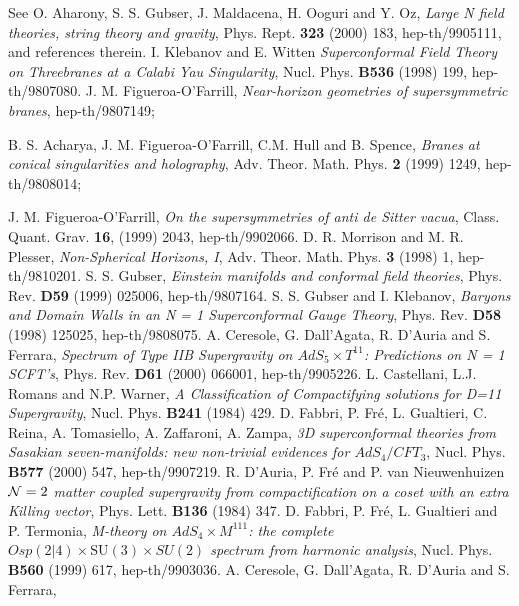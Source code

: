 \documentclass[a4paper,12pt]{article}
\begin{document}
\begin{thebibliography}{99}
 See O. Aharony, S. S. Gubser, J. Maldacena, H. Ooguri and Y. Oz,
{\it Large N field theories, string theory and gravity},
Phys. Rept. {\bf 323} (2000) 183,
hep-th/9905111, and references therein.
 I. Klebanov and E. Witten {\it Superconformal Field
Theory on Threebranes at a Calabi Yau Singularity},
Nucl. Phys. {\bf B536} (1998) 199, hep-th/9807080.
 J. M. Figueroa-O'Farrill, {\it Near-horizon geometries
of supersymmetric branes}, hep-th/9807149;
\par B. S. Acharya, J. M. Figueroa-O'Farrill, C.M. Hull and B. Spence,
{\it Branes at conical singularities and holography},
Adv. Theor. Math. Phys. {\bf 2} (1999) 1249, hep-th/9808014;
\par J. M. Figueroa-O'Farrill, {\it On the supersymmetries of anti de Sitter vacua},
Class. Quant. Grav. {\bf 16}, (1999) 2043, hep-th/9902066.
 D. R. Morrison and M. R. Plesser, {\it Non-Spherical Horizons, I},
Adv. Theor. Math. Phys. {\bf 3} (1998) 1, hep-th/9810201.
 S. S. Gubser,
{\it Einstein manifolds and conformal field theories},
Phys. Rev. {\bf D59} (1999) 025006, hep-th/9807164.
 S. S. Gubser and I. Klebanov,
{\it Baryons and Domain Walls in an N = 1 Superconformal Gauge Theory},
Phys. Rev. {\bf D58} (1998) 125025, hep-th/9808075.
 A. Ceresole, G. Dall'Agata, R. D'Auria and S. Ferrara,
{\it Spectrum of Type IIB Supergravity on $AdS_5\times T^{11}$:
Predictions on N = 1 SCFT's}, Phys. Rev. {\bf D61} (2000) 066001,
hep-th/9905226.
 L. Castellani, L.J. Romans and N.P. Warner, {\it
A Classification of Compactifying solutions for D=11 Supergravity},
Nucl. Phys. {\bf B241} (1984) 429.
 D. Fabbri, P. Fr\'e, L. Gualtieri, C. Reina, A. Tomasiello,
 A. Zaffaroni, A. Zampa, {\it 3D superconformal theories from Sasakian
 seven-manifolds: new non-trivial evidences for $AdS_4/CFT_3$},
 Nucl. Phys. {\bf B577} (2000) 547, hep-th/9907219.
 R. D'Auria, P. Fr\'e and P. van Nieuwenhuizen
{\it ${\cal N}=2$ matter coupled supergravity from compactification on a coset
with an extra Killing vector}, Phys. Lett. {\bf B136} (1984) 347.
 D. Fabbri, P. Fr\'e, L. Gualtieri and P. Termonia,
 {\it M-theory on $AdS_4 \times M^{111}$: the complete
 $Osp(2\vert 4)\times \mathrm{SU(3)} \times SU(2)$ spectrum from harmonic
 analysis}, Nucl. Phys. {\bf B560} (1999) 617, hep-th/9903036.
 A. Ceresole, G. Dall'Agata, R. D'Auria and S. Ferrara,

\end{thebibliography}
\end{document}
